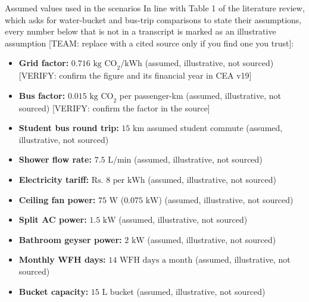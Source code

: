 \documentclass[12pt, a4paper]{article}
\begin{document}
\begin{synthesisbox}{Assumed values used in the scenarios}
In line with Table 1 of the literature review, which asks for water-bucket and bus-trip comparisons to state their assumptions, every number below that is not in a transcript is marked as an illustrative assumption [TEAM: replace with a cited source only if you find one you trust]:
\begin{itemize}
    \item \textbf{Grid factor:} $0.716\text{ kg CO}_2/\text{kWh}$ (assumed, illustrative, not sourced) [VERIFY: confirm the figure and its financial year in CEA v19]
    \item \textbf{Bus factor:} $0.015\text{ kg CO}_2$ per passenger-km (assumed, illustrative, not sourced) [VERIFY: confirm the factor in the source]
    \item \textbf{Student bus round trip:} $15\text{ km}$ assumed student commute (assumed, illustrative, not sourced)
    \item \textbf{Shower flow rate:} $7.5\text{ L/min}$ (assumed, illustrative, not sourced)
    \item \textbf{Electricity tariff:} $\text{Rs.\ } 8\text{ per kWh}$ (assumed, illustrative, not sourced)
    \item \textbf{Ceiling fan power:} $75\text{ W}$ ($0.075\text{ kW}$) (assumed, illustrative, not sourced)
    \item \textbf{Split AC power:} $1.5\text{ kW}$ (assumed, illustrative, not sourced)
    \item \textbf{Bathroom geyser power:} $2\text{ kW}$ (assumed, illustrative, not sourced)
    \item \textbf{Monthly WFH days:} $14\text{ WFH days a month}$ (assumed, illustrative, not sourced)
    \item \textbf{Bucket capacity:} $15\text{ L}$ bucket (assumed, illustrative, not sourced)
\end{itemize}
\end{synthesisbox}
\end{document}
